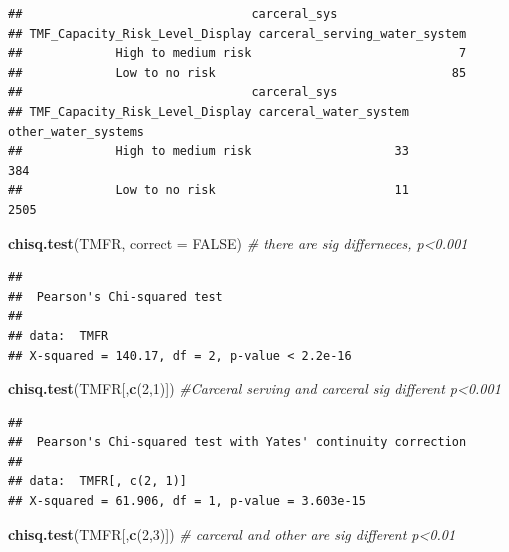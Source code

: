 \documentclass[
]{article}
\newenvironment{Shaded}{\begin{snugshade}}{\end{snugshade}}
\newcommand{\AttributeTok}[1]{\textcolor[rgb]{0.13,0.29,0.53}{#1}}
\newcommand{\CommentTok}[1]{\textcolor[rgb]{0.56,0.35,0.01}{\textit{#1}}}
\newcommand{\ConstantTok}[1]{\textcolor[rgb]{0.56,0.35,0.01}{#1}}
\newcommand{\DecValTok}[1]{\textcolor[rgb]{0.00,0.00,0.81}{#1}}
\newcommand{\FunctionTok}[1]{\textcolor[rgb]{0.13,0.29,0.53}{\textbf{#1}}}
\newcommand{\NormalTok}[1]{#1}
\begin{document}
\begin{verbatim}
##                                carceral_sys
## TMF_Capacity_Risk_Level_Display carceral_serving_water_system
##             High to medium risk                             7
##             Low to no risk                                 85
##                                carceral_sys
## TMF_Capacity_Risk_Level_Display carceral_water_system other_water_systems
##             High to medium risk                    33                 384
##             Low to no risk                         11                2505
\end{verbatim}

\begin{Shaded}
\begin{Highlighting}[]
\FunctionTok{chisq.test}\NormalTok{(TMFR, }\AttributeTok{correct =} \ConstantTok{FALSE}\NormalTok{) }\CommentTok{\# there are sig differneces, p\textless{}0.001}
\end{Highlighting}
\end{Shaded}

\begin{verbatim}
## 
##  Pearson's Chi-squared test
## 
## data:  TMFR
## X-squared = 140.17, df = 2, p-value < 2.2e-16
\end{verbatim}

\begin{Shaded}
\begin{Highlighting}[]
\FunctionTok{chisq.test}\NormalTok{(TMFR[,}\FunctionTok{c}\NormalTok{(}\DecValTok{2}\NormalTok{,}\DecValTok{1}\NormalTok{)]) }\CommentTok{\#Carceral serving and carceral sig different p\textless{}0.001}
\end{Highlighting}
\end{Shaded}

\begin{verbatim}
## 
##  Pearson's Chi-squared test with Yates' continuity correction
## 
## data:  TMFR[, c(2, 1)]
## X-squared = 61.906, df = 1, p-value = 3.603e-15
\end{verbatim}

\begin{Shaded}
\begin{Highlighting}[]
\FunctionTok{chisq.test}\NormalTok{(TMFR[,}\FunctionTok{c}\NormalTok{(}\DecValTok{2}\NormalTok{,}\DecValTok{3}\NormalTok{)]) }\CommentTok{\# carceral and other are sig different p\textless{}0.01}
\end{Highlighting}
\end{Shaded}
\end{document}
